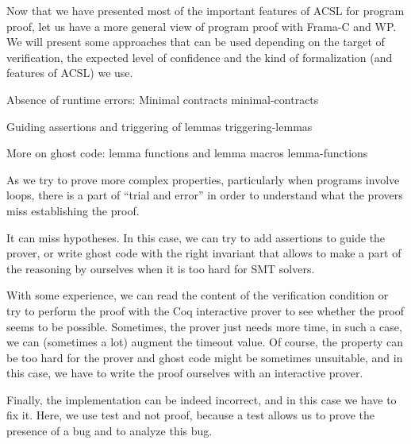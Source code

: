 Now that we have presented most of the important features of ACSL for program
proof, let us have a more general view of program proof with Frama-C and WP. We
will present some approaches that can be used depending on the target of
verification, the expected level of confidence and the kind of formalization
(and features of ACSL) we use.



\begin{levelTwo}
  {Absence of runtime errors: Minimal contracts}
  {minimal-contracts}
\end{levelTwo}

\begin{levelTwo}
  {Guiding assertions and triggering of lemmas}
  {triggering-lemmas}
\end{levelTwo}

\begin{levelTwo}
  {More on ghost code: lemma functions and lemma macros}
  {lemma-functions}
\end{levelTwo}



\horizontalLine
\newpage

As we try to prove more complex properties, particularly when
programs involve loops, there is a part of ``trial and error'' in
order to understand what the provers miss establishing the proof.

It can miss hypotheses. In this case, we can try to add assertions to
guide the prover, or write ghost code with the right invariant that
allows to make a part of the reasoning by ourselves when it is too hard
for SMT solvers.

With some experience, we can read the content of the verification condition or
try to perform the proof with the Coq interactive prover to see whether
the proof seems to be possible. Sometimes, the prover just needs more
time, in such a case, we can (sometimes a lot) augment the timeout value.
Of course, the property can be too hard for the prover and ghost code
might be sometimes unsuitable, and in this case, we have to write the
proof ourselves with an interactive prover.

Finally, the implementation can be indeed incorrect, and in this case we
have to fix it. Here, we use test and not proof, because a test
allows us to prove the presence of a bug and to analyze this bug.
